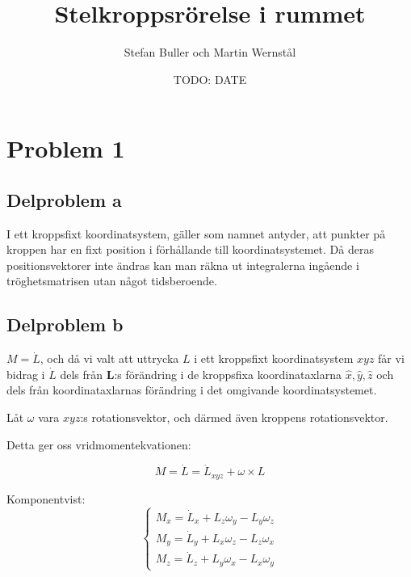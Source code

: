 \documentclass[12pt,a4paper]{article}
\begin{document}

\title{Stelkroppsrörelse i rummet}
	\author{Stefan Buller och Martin Wernstål}
	\date{TODO: DATE}
	\maketitle{}
	\thispagestyle{empty}

	\begin{abstract}
		
	\end{abstract}

\newpage{}

	\tableofcontents{}
	\thispagestyle{empty}

\newpage{}

	\setcounter{page}{1}
	\pagestyle{plain}
	
	
\section{Problem 1}
	\subsection{Delproblem a}
	I ett kroppsfixt koordinatsystem, gäller som namnet antyder, att punkter på kroppen
	har en fixt position i förhållande till koordinatsystemet. Då deras positionsvektorer
	inte ändras kan man räkna ut integralerna ingående i tröghetsmatrisen utan något tidsberoende.

	\subsection{Delproblem b}
	$M = \dot{L}$, och då vi valt att uttrycka $L$ i ett kroppsfixt koordinatsystem $xyz$ får vi
	bidrag i $\dot{L}$ dels från $\mathbf{L}$:s förändring i de kroppsfixa koordinataxlarna
	$\hat{x},\hat{y},\hat{z}$ och dels från koordinataxlarnas förändring i det omgivande
	koordinatsystemet.
	
	Låt $\omega$ vara $xyz$:s rotationsvektor, och därmed även kroppens rotationsvektor.
	
	Detta ger oss vridmomentekvationen:
	
	\begin{equation*}
		M = \dot{L} = \dot{L}_{xyz} + \omega \times L
	\end{equation*}
	
	
	Komponentvist:
	\begin{equation}
		\begin{cases}
			M_x = \dot{L}_x + L_z \omega_y - L_y \omega_z \\
			M_y = \dot{L}_y + L_x \omega_z - L_z \omega_x \\
			M_z = \dot{L}_z + L_y \omega_x - L_x \omega_y
		\end{cases}
		\label{vridmomentsekvationerna_komponentvis}
	\end{equation}
	
\end{document}
